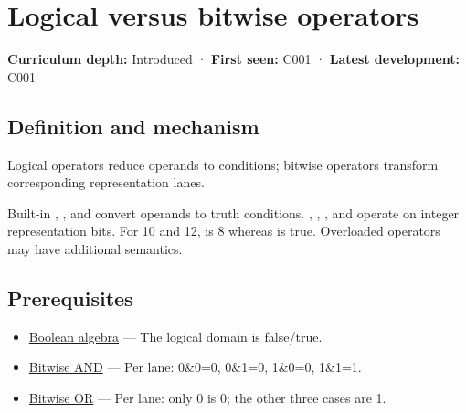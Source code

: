\hypertarget{appendix-fe6b457d68d8}{}\label{referencestart:appendix-fe6b457d68d8}
\section{Logical versus bitwise operators}\label{appendix-fe6b457d68d8-logical-versus-bitwise-operators}

\hypertarget{appendix-fe6b457d68d8-logical-versus-bitwise-operators}{}

\textbf{Curriculum depth:} Introduced · \textbf{First seen:} C001 · \textbf{Latest development:} C001

\begin{allmightroledefinition}

\subsection{Definition and mechanism}\label{appendix-fe6b457d68d8-definition-and-mechanism}

\hypertarget{appendix-fe6b457d68d8-definition-and-mechanism}{}

Logical operators reduce operands to conditions; bitwise operators transform corresponding representation lanes.

\end{allmightroledefinition}

Built-in \BookInlineCode{\&\&}, \BookInlineCode{\textbar\textbar{}}, and \BookInlineCode{!} convert operands to truth conditions. \BookInlineCode{\&}, \BookInlineCode{\textbar{}}, \BookInlineCode{\^{}}, and \BookInlineCode{\textasciitilde{}} operate on integer representation bits. For 10 and 12,  is 8 whereas  is true. Overloaded operators may have additional semantics.

\subsection{Prerequisites}\label{appendix-fe6b457d68d8-prerequisites}

\hypertarget{appendix-fe6b457d68d8-prerequisites}{}

\begin{itemize}
\tightlist
\item
  \hyperref[appendix-24475e1596a8]{Boolean algebra} --- The logical domain is false/true.
\item
  \hyperref[appendix-68b52453737c]{Bitwise AND} --- Per lane: 0\&0=0, 0\&1=0, 1\&0=0, 1\&1=1.
\item
  \hyperref[appendix-a427ce8ce8a6]{Bitwise OR} --- Per lane: only 0 is 0; the other three cases are 1.
\end{itemize}

